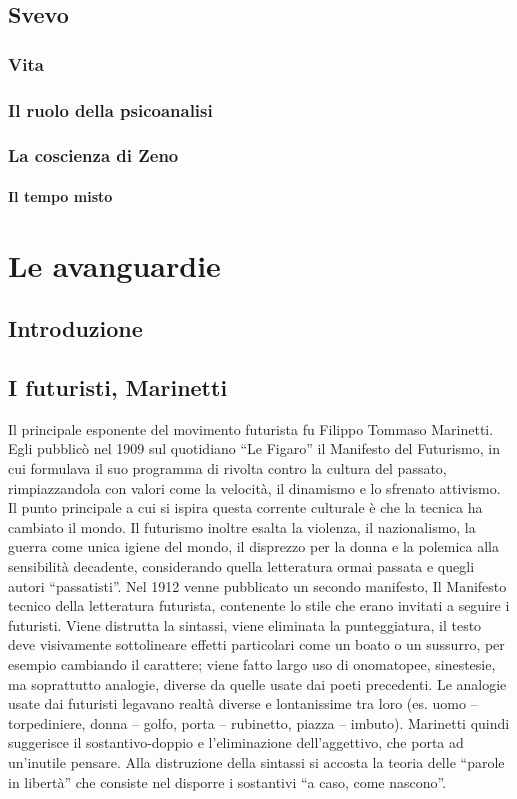 \documentclass[10pt]{report}
\begin{document}
	\section{Svevo}
		\subsection{Vita}
		\subsection{Il ruolo della psicoanalisi}
		\subsection{La coscienza di Zeno}
			\subsubsection{Il tempo misto}
	
	\chapter{Le avanguardie}
		\section{Introduzione}
		\section[Marinetti]{I futuristi, Marinetti}
		Il principale esponente del movimento futurista fu Filippo Tommaso Marinetti. Egli pubblicò nel 1909 sul quotidiano “Le Figaro” il Manifesto del Futurismo, in cui formulava il suo programma di rivolta contro la cultura del passato, rimpiazzandola con valori come la velocità, il dinamismo e lo sfrenato attivismo. Il punto principale a cui si ispira questa corrente culturale è che la tecnica ha cambiato il mondo. Il futurismo inoltre esalta la violenza, il nazionalismo, la guerra come unica igiene del mondo, il disprezzo per la donna e la polemica alla sensibilità decadente, considerando quella letteratura ormai passata e quegli autori “passatisti”.
		Nel 1912 venne pubblicato un secondo manifesto, Il Manifesto tecnico della letteratura futurista, contenente lo stile che erano invitati a seguire i futuristi. Viene distrutta la sintassi, viene eliminata la punteggiatura, il testo deve visivamente sottolineare effetti particolari come un boato o un sussurro, per esempio cambiando il carattere; viene fatto largo uso di onomatopee, sinestesie, ma soprattutto analogie, diverse da quelle usate dai poeti precedenti. Le analogie usate dai futuristi legavano realtà diverse e lontanissime tra loro (es. uomo – torpediniere, donna – golfo, porta – rubinetto, piazza – imbuto). Marinetti quindi suggerisce il sostantivo-doppio e l’eliminazione dell’aggettivo, che porta ad un’inutile pensare. Alla distruzione della sintassi si accosta la teoria delle “parole in libertà” che consiste nel disporre i sostantivi “a caso, come nascono”.
		
\end{document}

